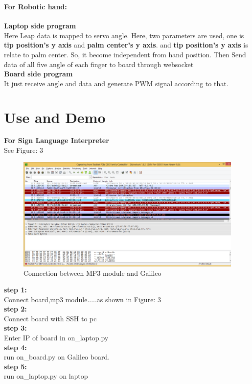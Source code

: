 \documentclass[a4paper,12pt,oneside]{book}
\begin{document}
\vspace{.3cm}
\textbf{For Robotic hand:}\\
\vspace{.3cm}\\
\textbf{Laptop side program}\\
Here Leap data is mapped to servo angle. Here, two parameters are used, one is \textbf{tip position's y axis} and \textbf{palm center's y axis}. and \textbf{tip position's y axis} is relate to palm center. So, it become independent from hand position. Then Send data of all five angle of each finger to board through websocket\\
\textbf{Board side program}\\
It just receive angle and data and generate PWM signal according to that.
\section{Use and Demo}
\textbf{For Sign Language Interpreter}\\
See Figure: 3\\
\begin{figure}
  \includegraphics[width=\linewidth]{3.png}
  \caption{Connection between MP3 module and Galileo}
\end{figure}
\textbf{step 1:}\\
Connect board,mp3 module.....as shown in Figure: 3\\
\textbf{step 2:}\\
Connect board with SSH to pc\\
\textbf{step 3:}\\
Enter IP of board in on\_laptop.py\\
\textbf{step 4:}\\
run on\_board.py on Galileo board.\\
\textbf{step 5:}\\
run on\_laptop.py on laptop\\
\end{document}
